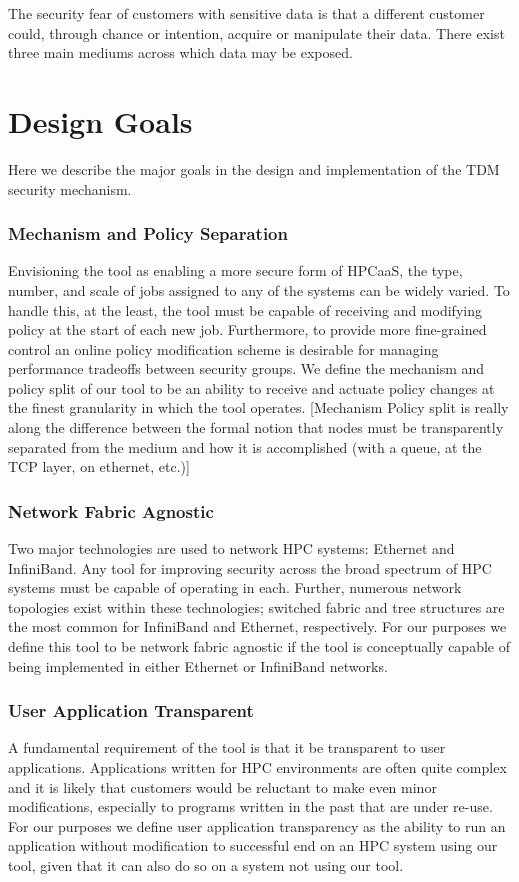 \documentclass[oneside,12pt]{memoir}
\begin{document}
The security fear of customers with sensitive data is that a different customer could, through chance or intention, acquire or manipulate their data. There exist three main mediums across which data may be exposed. 
\chapter{Design Goals}
Here we describe the major goals in the design and implementation of the TDM security mechanism.
\subsection{Mechanism and Policy Separation}
Envisioning the tool as enabling a more secure form of HPCaaS, the type, number, and scale of jobs assigned to any of the systems can be widely varied. To handle this, at the least, the tool must be capable of receiving and modifying policy at the start of each new job. Furthermore, to provide more fine-grained control an online policy modification scheme is desirable for managing performance tradeoffs between security groups. We define the mechanism and policy split of our tool to be an ability to receive and actuate policy changes at the finest granularity in which the tool operates. [Mechanism Policy split is really along the difference between the formal notion that nodes must be transparently separated from the medium and how it is accomplished (with a queue, at the TCP layer, on ethernet, etc.)]
\subsection{Network Fabric Agnostic}
Two major technologies are used to network HPC systems: Ethernet and InfiniBand. Any tool for improving security across the broad spectrum of HPC systems must be capable of operating in each. Further, numerous network topologies exist within these technologies; switched fabric and tree structures are the most common for InfiniBand and Ethernet, respectively. For our purposes we define this tool to be network fabric agnostic if the tool is conceptually capable of being implemented in either Ethernet or InfiniBand networks. 
\subsection{User Application Transparent}
A fundamental requirement of the tool is that it be transparent to user applications. Applications written for HPC environments are often quite complex and it is likely that customers would be reluctant to make even minor modifications, especially to programs written in the past that are under re-use. For our purposes we define user application transparency as the ability to run an application without modification to successful end on an HPC system using our tool, given that it can also do so on a system not using our tool. 
\end{document}
